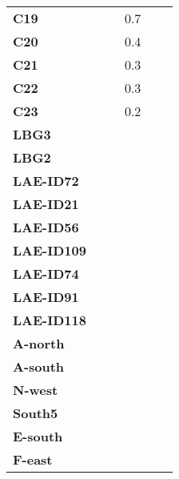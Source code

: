 \begin{tabular}{lrrrrl}
\textbf{C19      } &           &              &      0.7 &             &        \\
\textbf{C20      } &           &              &      0.4 &             &        \\
\textbf{C21      } &           &              &      0.3 &             &        \\
\textbf{C22      } &           &              &      0.3 &             &        \\
\textbf{C23      } &           &              &      0.2 &             &        \\
\textbf{LBG3     } &           &              &          &             &        \\
\textbf{LBG2     } &           &              &          &             &        \\
\textbf{LAE-ID72 } &           &              &          &             &        \\
\textbf{LAE-ID21 } &           &              &          &             &        \\
\textbf{LAE-ID56 } &           &              &          &             &        \\
\textbf{LAE-ID109} &           &              &          &             &        \\
\textbf{LAE-ID74 } &           &              &          &             &        \\
\textbf{LAE-ID91 } &           &              &          &             &        \\
\textbf{LAE-ID118} &           &              &          &             &        \\
\textbf{A-north  } &           &              &          &             &        \\
\textbf{A-south  } &           &              &          &             &        \\
\textbf{N-west   } &           &              &          &             &        \\
\textbf{South5   } &           &              &          &             &        \\
\textbf{E-south  } &           &              &          &             &        \\
\textbf{F-east   } &           &              &          &             &        \\
\bottomrule
\end{tabular}
